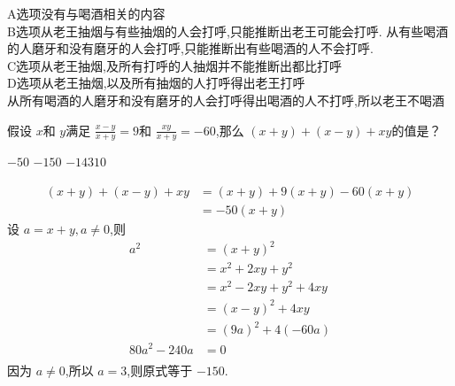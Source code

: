 \documentclass[answers]{exam}
\begin{document}
\begin{questions}
	\begin{solution}

		A选项没有与喝酒相关的内容 \\
		B选项从老王抽烟与有些抽烟的人会打呼,只能推断出老王可能会打呼.
		从有些喝酒的人磨牙和没有磨牙的人会打呼,只能推断出有些喝酒的人不会打呼.\\
		C选项从老王抽烟,及所有打呼的人抽烟并不能推断出都比打呼 \\
		D选项从老王抽烟,以及所有抽烟的人打呼得出老王打呼\\
		从所有喝酒的人磨牙和没有磨牙的人会打呼得出喝酒的人不打呼,所以老王不喝酒

	\end{solution}
	\question 假设 \( x \)和 \( y \)满足 \( \frac{x-y}{x+y}=9 \)和 \( \frac{xy}{x+y}=-60 \),那么 \( (x+y) + (x-y) + xy
	\)的值是？

	\begin{oneparchoices}
		\choice \( -50 \) \CorrectChoice \( -150 \) \choice \( -14310 \)  
	\end{oneparchoices}

	\begin{solution}
		\begin{align*}
			(x+y) + (x-y) + xy & = (x+y) + 9(x+y) -60(x+y) \\
			                   & = -50(x+y)
		\end{align*}
		设 \( a = x + y, a \ne 0 \),则
		\begin{align*}
			a^2         & = (x+y)^2              \\
			            & = x^2 + 2xy + y^2      \\
			            & = x^2 - 2xy + y^2 +4xy \\
			            & = (x-y)^2 + 4xy        \\
			            & = (9a)^2 + 4(-60a)     \\
			80a^2 -240a & = 0                    \\
		\end{align*}
		因为 \( a \ne 0 \),所以 \( a = 3 \),则原式等于 \( -150 \).
	\end{solution}

\end{questions}
\end{document}
